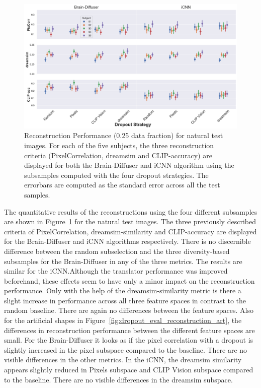 \begin{figure}[ht]
  \centering
  \includegraphics[width=1\textwidth]{plots/dropout_eval_reconstruction_test.png}
  \caption[Experiment 1: Reconstruction performance for natural test images]{Reconstruction Performance (0.25 data fraction) for natural test images. For each of the five subjects, the three reconstruction criteria (PixelCorrelation, dreamsim and CLIP-accuracy) are displayed for both the Brain-Diffuser and iCNN algorithm using the subsamples computed with the four dropout strategies. The errorbars are computed as the standard error across all the test samples.}\label{fig:dropout_eval_reconstruction_test}
\end{figure}

The quantitative results of the reconstructions using the four different subsamples are shown in Figure~\ref{fig:dropout_eval_reconstruction_test} for the natural test images. The three previously described criteria of PixelCorrelation, dreamsim-similarity and CLIP-accuracy are displayed for the Brain-Diffuser and iCNN algorithms respectively. There is no discernible difference between the random subselection and the three diversity-based subsamples for the Brain-Diffuser in any of the three metrics. The results are similar for the iCNN.\@ Although the translator performance was improved beforehand, these effects seem to have only a minor impact on the reconstruction performance. Only with the help of the dreamsim-similarity metric is there a slight increase in performance across all three feature spaces in contrast to the random baseline. There are again no differences between the feature spaces. Also for the artificial shapes in Figure~\ref{fig:dropout_eval_reconstruction_art}, the differences in reconstruction performance between the different feature spaces are small. For the Brain-Diffuser it looks as if the pixel correlation with a dropout is slightly increased in the pixel subspace compared to the baseline. There are no visible differences in the other metrics. In the iCNN, the dreamsim similarity appears slightly reduced in Pixels subspace and CLIP Vision subspace compared to the baseline. There are no visible differences in the dreamsim subspace.

